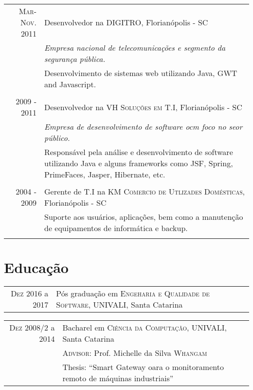 \documentclass[a4paper,10pt]{article}
\begin{document}
\begin{tabular}{r|p{11cm}}
\textsc{Mar-Nov. 2011} & Desenvolvedor na \textsc{DIGITRO}, Florianópolis - SC \\ &\emph{Empresa nacional de telecomunicações e segmento da segurança pública.}\\&\footnotesize{Desenvolvimento de sistemas web utilizando Java, GWT and Javascript.} \\\multicolumn{2}{c}{} \\

\textsc{2009 - 2011} & Desenvolvedor na \textsc{VH Soluções em T.I}, Florianópolis - SC \\ &\emph{Empresa de desenvolvimento de software ocm foco no seor público.}\\&\footnotesize{Responsável pela análise e desenvolvimento de software utilizando Java e alguns frameworks como JSF, Spring, PrimeFaces, Jasper, Hibernate, etc.}\\\multicolumn{2}{c}{} \\

\textsc{2004 - 2009} & Gerente de T.I na \textsc{KM Comercio de Utlizades Domésticas}, Florianópolis - SC \\&\footnotesize{Suporte aos usuários, aplicações, bem como a manutenção de equipamentos de informática e backup.}\\\multicolumn{2}{c}{} \\ 

\end{tabular}

\section{Educação}

\begin{tabular}{rl}	

\textsc{Dez} 2016 a 2017 & Pós graduação em \textsc{Engeharia e Qualidade de Software}, UNIVALI, Santa Catarina\\

\end{tabular}


\begin{tabular}{rl}	

\textsc{Dez} 2008/2 a 2014 & Bacharel em \textsc{Ciência da Computação}, UNIVALI, Santa Catarina\\
&\normalsize \textsc{Advisor}: Prof. Michelle da Silva \textsc{Whangam}\\
& Thesis: ``Smart Gateway oara o monitoramento remoto de máquinas industriais''

\end{tabular}
\end{document}
